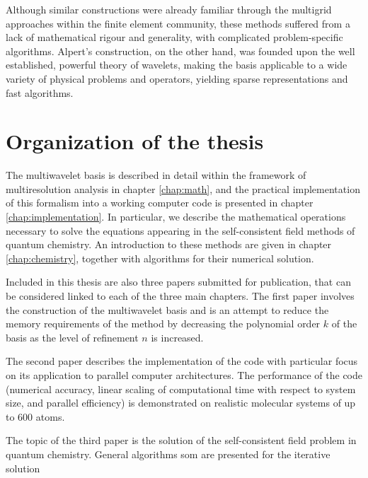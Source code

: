 Although similar constructions were already familiar through the multigrid approaches 
within the finite element community, these methods suffered from a lack of mathematical
rigour and generality, with complicated problem-specific algorithms. Alpert's construction, 
on the other hand, was founded upon the well established, powerful theory of wavelets, 
making the basis applicable to a wide variety of physical problems and operators,
yielding sparse representations and fast algorithms.

\section{Organization of the thesis}
The multiwavelet basis is described in detail within the framework of multiresolution 
analysis in chapter \ref{chap:math}, and the practical implementation of this formalism
into a working computer code is presented in chapter \ref{chap:implementation}. In 
particular, we describe the mathematical operations necessary to solve the equations 
appearing in the self-consistent field methods of quantum chemistry. An introduction
to these methods are given in chapter \ref{chap:chemistry}, together with algorithms 
for their numerical solution.

Included in this thesis are also three papers submitted for publication, that can be
considered linked to each of the three main chapters. The first paper involves the
construction of the multiwavelet basis and is an attempt to reduce the memory 
requirements of the method by decreasing the polynomial order $k$ of the basis as 
the level of refinement $n$ is increased. 

The second paper describes the implementation of the code with particular focus on its
application to parallel computer architectures. The performance of the code (numerical
accuracy, linear scaling of computational time with respect to system size, and parallel
efficiency) is demonstrated on realistic molecular systems of up to 600 atoms.

The topic of the third paper is the solution of the self-consistent field problem
in quantum chemistry. General algorithms som are presented for the iterative solution




